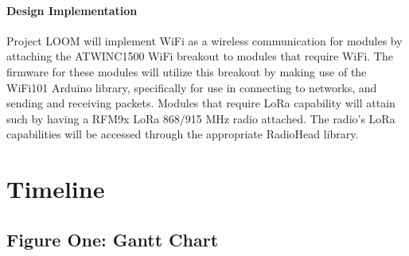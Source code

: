 \documentclass[onecolumn, draftclsnofoot,10pt, compsoc]{IEEEtran}
\begin{document}
\paragraph{Design Implementation}
    Project LOOM will implement WiFi as a wireless communication for modules by attaching the ATWINC1500 WiFi breakout to modules that require WiFi. The firmware for these modules will utilize this breakout by making use of the WiFi101 Arduino library, specifically for use in connecting to networks, and sending and receiving packets. Modules that require LoRa capability will attain such by having a RFM9x LoRa 868/915 MHz radio attached. The radio's LoRa capabilities will be accessed through the appropriate RadioHead library. 





\section{Timeline}

\subsection{Figure One: Gantt Chart}
    \noindent{}
\end{document}
